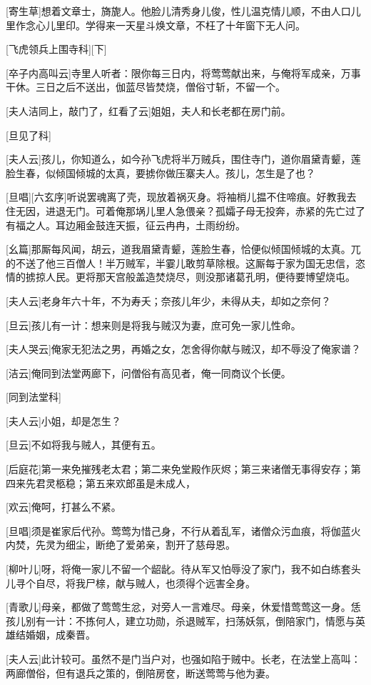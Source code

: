 \documentclass{book}
\begin{document}
[寄生草]想着文章士，旖旎人。他脸儿清秀身儿俊，性儿温克情儿顺，不由人口儿里作念心儿里印。学得来一天星斗焕文章，不枉了十年窗下无人问。

[飞虎领兵上围寺科][下]

[卒子内高叫云]寺里人听者：限你每三日内，将莺莺献出来，与俺将军成亲，万事干休。三日之后不送出，伽蓝尽皆焚烧，僧俗寸斩，不留一个。

[夫人洁同上，敲门了，红看了云]姐姐，夫人和长老都在房门前。

[旦见了科]

[夫人云]孩儿，你知道么，如今孙飞虎将半万贼兵，围住寺门，道你眉黛青颦，莲脸生春，似倾国倾城的太真，要掳你做压寨夫人。孩儿，怎生是了也？

[旦唱][六玄序]听说罢魂离了壳，现放着祸灭身。将袖梢儿揾不住啼痕。好教我去住无因，进退无门。可着俺那埚儿里人急偎亲？孤孀子母无投奔，赤紧的先亡过了有福之人。耳边厢金鼓连天振，征云冉冉，土雨纷纷。

[幺篇]那厮每风闻，胡云，道我眉黛青颦，莲脸生春，恰便似倾国倾城的太真。兀的不送了他三百僧人！半万贼军，半霎儿敢剪草除根。这厮每于家为国无忠信，恣情的掳掠人民。更将那天宫般盖造焚烧尽，则没那诸葛孔明，便待要博望烧屯。

[夫人云]老身年六十年，不为寿夭；奈孩儿年少，未得从夫，却如之奈何？

[旦云]孩儿有一计：想来则是将我与贼汉为妻，庶可免一家儿性命。

[夫人哭云]俺家无犯法之男，再婚之女，怎舍得你献与贼汉，却不辱没了俺家谱？

[洁云]俺同到法堂两廊下，问僧俗有高见者，俺一同商议个长便。

[同到法堂科]

[夫人云]小姐，却是怎生？

[旦云]不如将我与贼人，其便有五。

[后庭花]第一来免摧残老太君；第二来免堂殿作灰烬；第三来诸僧无事得安存；第四来先君灵柩稳；第五来欢郎虽是未成人，

[欢云]俺呵，打甚么不紧。

[旦唱]须是崔家后代孙。莺莺为惜己身，不行从着乱军，诸僧众污血痕，将伽蓝火内焚，先灵为细尘，断绝了爱弟亲，割开了慈母恩。

[柳叶儿]呀，将俺一家儿不留一个龆龀。待从军又怕辱没了家门，我不如白练套头儿寻个自尽，将我尸榇，献与贼人，也须得个远害全身。

[青歌儿]母亲，都做了莺莺生忿，对旁人一言难尽。母亲，休爱惜莺莺这一身。恁孩儿别有一计：不拣何人，建立功勋，杀退贼军，扫荡妖氛，倒陪家门，情愿与英雄结婚姻，成秦晋。

[夫人云]此计较可。虽然不是门当户对，也强如陷于贼中。长老，在法堂上高叫：两廊僧俗，但有退兵之策的，倒陪房奁，断送莺莺与他为妻。
\end{document}
